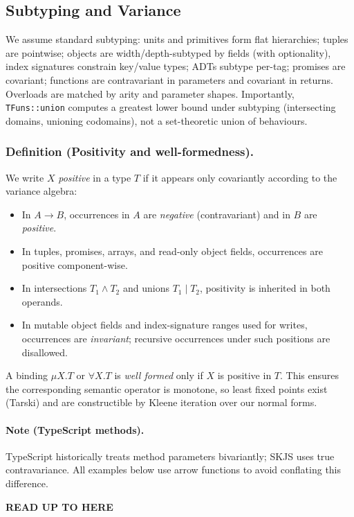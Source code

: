 \documentclass[11pt]{article}
\begin{document}
\subsection{Subtyping and Variance}
We assume standard subtyping: units and primitives form flat hierarchies; tuples are pointwise; objects are width/depth-subtyped by fields (with optionality), index signatures constrain key/value types; ADTs subtype per-tag; promises are covariant; functions are contravariant in parameters and covariant in returns. Overloads are matched by arity and parameter shapes. Importantly, \texttt{TFuns::union} computes a greatest lower bound under subtyping (intersecting domains, unioning codomains), not a set-theoretic union of behaviours.


\subsubsection*{Definition (Positivity and well-formedness).}\label{def:positivity}
We write $X$ \emph{positive} in a type $T$ if it appears only covariantly according to the variance algebra:
\begin{itemize}[leftmargin=*]
  \item In $A\to B$, occurrences in $A$ are \emph{negative} (contravariant) and in $B$ are \emph{positive}.
  \item In tuples, promises, arrays, and read-only object fields, occurrences are positive component-wise.
  \item In intersections $T_1\wedge T_2$ and unions $T_1\mid T_2$, positivity is inherited in both operands.
  \item In mutable object fields and index-signature ranges used for writes, occurrences are \emph{invariant}; recursive occurrences under such positions are disallowed.
\end{itemize}
A binding $\mu X.T$ or $\forall X.T$ is \emph{well formed} only if $X$ is positive in $T$. This ensures the corresponding semantic operator is monotone, so least fixed points exist (Tarski) and are constructible by Kleene iteration over our normal forms.
\paragraph*{Note (TypeScript methods).}
TypeScript historically treats method parameters bivariantly; SKJS uses true contravariance. All examples below use arrow functions to avoid conflating this difference.

{\color{red}\textbf{READ UP TO HERE}} 
\end{document}

